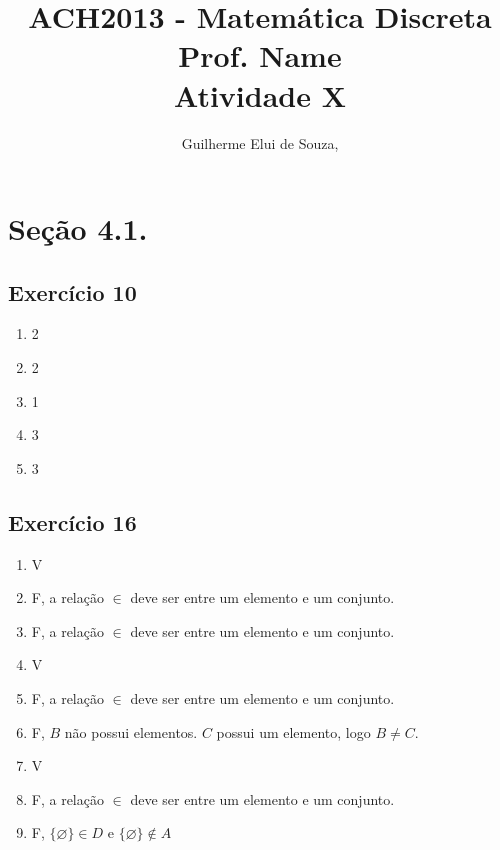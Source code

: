 \documentclass[12pt,a4paper]{article}
\begin{document}
\author{Guilherme Elui de Souza,  }
\title{ACH2013 - Matemática Discreta \\
\large Prof. Name \\
\large Atividade X}
\maketitle

\section*{Seção 4.1.}
\subsection*{Exercício 10}
\begin{enumerate}[label=\textbf{\alph*.}]
\item 2 
\item 2
\item 1
\item 3
\item 3
\end{enumerate}
\subsection*{Exercício 16}
\begin{enumerate}[label=\textbf{\alph*.}]
\item V
\item F, \quad a relação $\in$ deve ser entre um elemento e um conjunto.
\item F, \quad a relação $\in$ deve ser entre um elemento e um conjunto.
\item V
\item F, \quad a relação $\in$ deve ser entre um elemento e um conjunto.
\item F, \quad $B$ não possui elementos. $C$ possui um elemento, logo $B \neq C$.
\item V
\item F, \quad a relação $\in$ deve ser entre um elemento e um conjunto.
\item F, \quad $\{{\varnothing}\} \in D$ e $\{{\varnothing}\} \not\in A$
\end{enumerate}
\end{document}
